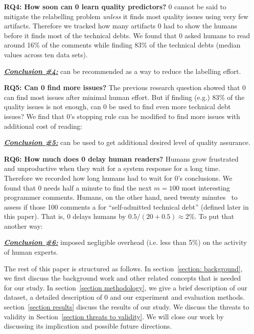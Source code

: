 \documentclass[10pt,conference]{IEEEtran}
\newenvironment{result}[2]
{\begin{myshadowbox}\textbf{\textit{\underline{Conclusion \##1:}}} #2}{ 
\end{myshadowbox}}
\begin{document}
{\bf RQ4: How soon can   {\IT}0 learn quality predictors?}
{\IT}0 cannot be said to mitigate the relabelling problem
{\em unless} it finds most quality issues
using very few artifacts. Therefore we tracked how many artifacts {\IT}0 had to
show the humans before it finds most of the technical debts.
We found that {\IT}0 asked
   humans to read around  16\% of the comments while finding 83\% of the technical debts (median values across ten data sets).
\begin{result}{4}
   {\IT}0   can be recommended as a way to reduce the labelling effort.
\end{result}
{\bf RQ5: Can {\IT}0 find more    issues?}
The previous research question showed that {\IT}0 can find most issues after minimal human
effort. But  if finding (e.g.) 83\% of the quality issues is not enough,
can {\IT}0 be used to find  even more technical debt issues?
We find that {\IT}0's stopping rule can be modified to find more issues with additional cost of reading:
\begin{result}{5}
 {\IT}0 can be used to get additional desired level of quality assurance.
\end{result}

{\bf RQ6: How much does {\IT}0 delay human readers?}
Humans grow frustrated and unproductive when they wait for a system response for a long time.
Therefore we recorded how long humans had to wait
for {\IT}0's conclusions.
We found that {\IT}0 needs   half a minute  to find the   next   
$m=100$ most interesting 
programmer comments.
Humans, on the other hand,
need
 twenty minutes~\cite{maldonado2015detecting} to assess if those 100  comments  a for ``self-admitted technical debt'' (defined later in this paper).
That is, {\IT}0 delays humans by $0.5/(20+0.5) \approx 2\%$. To put that another way:
\begin{result}{6}
{\IT}0 imposed
negligible overhead  (i.e. less than 5\%) on the activity of human experts.
\end{result}
 The rest of this paper is structured as follows. In section~\ref{section: background}, we first discuss the background work and other related concepts that is needed for our study. In section~\ref{section methodology}, we give a brief description of our dataset, a detailed description of {\IT}0 and our experiment and evaluation methods. section~\ref{section results} discuss the results of our study. We discuss the threats to validity in Section~\ref{section threats to validity}. We will close our work    by discussing its implication and possible future directions.
 
\end{document}
